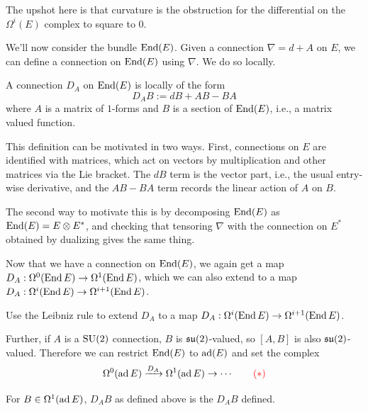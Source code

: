 \documentclass[main]{subfiles}
\begin{document}
The upshot here is that curvature is the obstruction for the differential on the $\Omega^i(E)$ complex to square to $0$.

We'll now consider the bundle $\operatorname{End}(E)$. Given a connection $\nabla=d+A$ on $E$, we can define a connection on $\operatorname{End}(E)$ using $\nabla$. We do so locally.

\begin{definition}
A connection $D_A$ on $\operatorname{End}(E)$ is locally of the form
\[
D_AB := dB + AB - BA
\]
where $A$ is a matrix of $1$-forms and $B$ is a section of $\operatorname{End}(E)$, i.e., a matrix valued function.
\end{definition}

This definition can be motivated in two ways. First, connections on $E$ are identified with matrices, which act on vectors by multiplication and other matrices via the Lie bracket. The $dB$ term is the vector part, i.e., the usual entry-wise derivative, and the $AB-BA$ term records the linear action of $A$ on $B$.

The second way to motivate this is by decomposing $\operatorname{End}(E)$ as $\operatorname{End}(E) = E\otimes E^\ast$, and checking that tensoring $\nabla$ with the connection on $E^\ast$ obtained by dualizing gives the same thing.

Now that we have a connection on $\operatorname{End}(E)$, we again get a map $D_A : \Omega^0(\operatorname{End} E) \to \Omega^1(\operatorname{End} E)$, which we can also extend to a map $D_A : \Omega^i(\operatorname{End} E) \to \Omega^{i+1}(\operatorname{End} E)$.

\begin{exercise}
Use the Leibniz rule to extend $D_A$ to a map $D_A : \Omega^i(\operatorname{End} E) \to \Omega^{i+1}(\operatorname{End} E)$.
\end{exercise}

Further, if $A$ is a $\operatorname{SU}(2)$ connection, $B$ is $\mathfrak{su}(2)$-valued, so $[A,B]$ is also $\mathfrak{su}(2)$-valued. Therefore we can restrict $\operatorname{End}(E)$ to $\operatorname{ad}(E)$ and set the complex
\[
\Omega^0(\operatorname{ad} E) \xrightarrow{D_A} \Omega^1(\operatorname{ad} E) \to \cdots \qquad \textcolor{red}{(\ast)}
\]

\begin{lemma}
For $B\in\Omega^1(\operatorname{ad} E)$, $D_AB$ as defined above is the $D_AB$ defined.
\textcolor{red}{}
\end{lemma}
\end{document}
